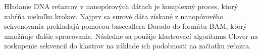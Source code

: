 Hľadanie DNA reťazcov v nanopórových dátach je komplexný proces, ktorý zahŕňa niekoľko krokov. Najprv sa surové dáta získané z nanopórového sekvenovania prekladajú pomocou basecallera Dorado do formátu BAM, ktorý umožňuje ďalšie spracovanie. Následne sa použije klastrovací algoritmus Clover na zoskupenie sekvencií do klastrov na základe ich podobnosti na začiatku reťazca.
